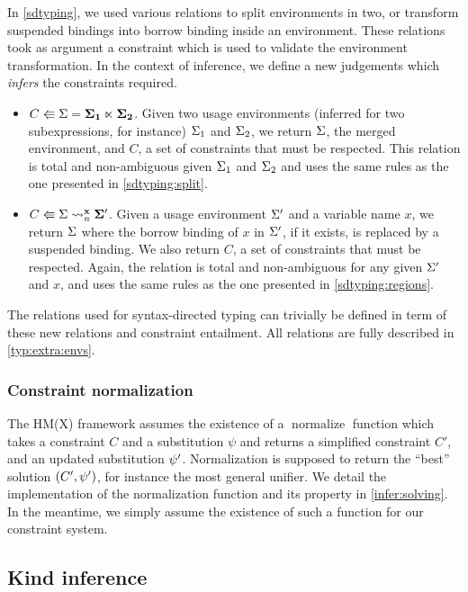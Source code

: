 In \cref{sdtyping}, we used various relations to split environments in two, or
transform suspended bindings into borrow binding inside an environment.
These relations took as argument a constraint which is used to validate
the environment transformation.
In the context of inference, we define a new judgements which \emph{infers}
the constraints required.
\begin{itemize}
\item $C \Lleftarrow \Sigma = \bf{\Sigma_1} \ltimes \bf{\Sigma_2}$.
  Given two usage environments (inferred for two subexpressions, for instance)
  $\Sigma_1$ and $\Sigma_2$, we return $\Sigma$, the merged environment, and $C$, a set
  of constraints that must be respected.
  This relation is total and non-ambiguous given $\Sigma_1$ and $\Sigma_2$
  and uses the same rules as the one presented in \cref{sdtyping:split}.
\item $C \Lleftarrow \Sigma \rightsquigarrow_n^{\bf{x}} \bf\Sigma'$.
  Given a usage environment $\Sigma'$ and a variable name $x$, we return
  $\Sigma$ where the borrow binding of $x$ in $\Sigma'$, if it exists, is replaced by
  a suspended binding. We also return $C$, a set of constraints that must
  be respected.
  Again, the relation is total and non-ambiguous for any given $\Sigma'$ and $x$,
  and uses the same rules as the one presented in \cref{sdtyping:regions}.
\end{itemize}

The relations used for syntax-directed typing can trivially be defined
in term of these new relations and constraint entailment.
All relations are fully described in \cref{typ:extra:envs}.

\subsubsection{Constraint normalization}

The HM(X) framework assumes the existence of a $\operatorname{normalize}$
function which takes a constraint $C$ and a substitution $\psi$ and returns a
simplified constraint $C'$,
and an updated substitution $\mathrm{\psi}'$.
Normalization is supposed to return the ``best'' solution $(C',\mathrm{\psi}')$, for
instance the most general unifier.
We detail the implementation
of the normalization function and its property in \cref{infer:solving}.
In the meantime, we simply
assume the existence of such a function for our constraint system.

\subsection{Kind inference}

